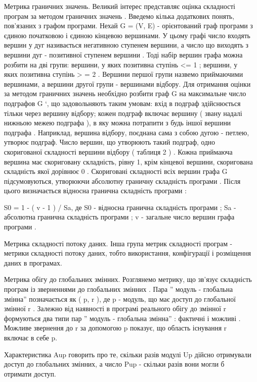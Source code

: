 Метрика граничних значень.
Великий інтерес представляє оцінка складності програм за методом граничних значень .
Введемо кілька додаткових понять, пов'язаних з графом програми.
Нехай G = (V, E) - орієнтований граф програми з єдиною початковою і єдиною кінцевою вершинами. У цьому графі число входять вершин у дуг називається негативною ступенем вершини, а число що виходять з вершини дуг - позитивної ступенем вершини . Тоді набір вершин графа можна розбити на дві групи: вершини, у яких позитивна ступінь \textless{}= 1 ; вершини, у яких позитивна ступінь \textgreater{} = 2 .
Вершини першої групи назвемо приймаючими вершинами, а вершини другої групи - вершинами відбору.
Для отримання оцінки за методом граничних значень необхідно розбити граф G на максимальне число подграфов G `, що задовольняють таким умовам: вхід в подграф здійснюється тільки через вершину відбору; кожен подграф включає вершину ( звану надалі нижньою межею подграфа ), в яку можна потрапити з будь іншої вершини подграфа . Наприклад, вершина відбору, поєднана сама з собою дугою - петлею, утворює подграф.
Число вершин, що утворюють такий подграф, одно скоригованої складності вершини відбору ( таблиця 2 ) . Кожна приймаюча вершина має скориговану складність, рівну 1, крім кінцевої вершини, скоригована складність якої дорівнює 0 . Скориговані складності всіх вершин графа G підсумовуються, утворюючи абсолютну граничну складність програми . Після цього визначається відносна гранична складність програми :

S0 = 1 - ( v - 1 ) / Sa,
де S0 - відносна гранична складність програми ; Sa - абсолютна гранична складність програми ; v - загальне число вершин графа програми .

Метрика складності потоку даних.
Інша група метрик складності програм - метрики складності потоку даних, тобто використання, конфігурації і розміщення даних в програмах.

Метрика обігу до глобальних змінних.
Розглянемо метрику, що зв'язує складність програм із зверненнями до глобальних змінних .
Пара '' модуль - глобальна змінна'' позначається як ( p, r ), де p - модуль, що має доступ до глобальної змінної r . Залежно від наявності в програмі реального обігу до змінної r формуються два типи пар '' модуль - глобальна змінна'' : фактичні і можливі . Можливе звернення до r за допомогою p показує, що область існування r включає в себе p.

Характеристика Aup говорить про те, скільки разів модулі Up дійсно отримували доступ до глобальних змінних, а число Pup - скільки разів вони могли б отримати доступ.

